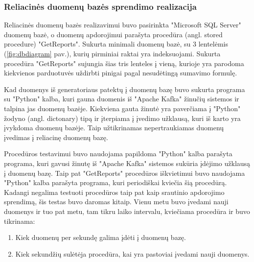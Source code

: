 \documentclass{VUMIFPSkursinis}
\begin{document}
 \subsubsection{Reliacinės duomenų bazės sprendimo realizacija}

Reliacinės duomenų bazės realizavimui buvo pasirinkta "Microsoft SQL Server" duomenų bazė, o duomenų apdorojimui parašyta procedūra (angl. stored procedure) "GetReports".
Sukurta minimali duomenų bazė, su 3 lentelėmis (\ref{fig:dbdiagram} pav.), kurių pirminiai raktai yra indeksuojami. Sukurta procedūra "GetReports" sujungia šias tris lenteles į vieną, kurioje yra parodoma kiekvienos 
parduotuvės uždirbti pinigai pagal nesudėtingą sumavimo formulę.\par
Kad duomenys iš generatoriaus patektų į duomenų bazę buvo sukurta programa su "Python" kalba, kuri gauna duomenis iš "Apache Kafka" žinučių sistemos ir talpina jas
duomenų bazėje. Kiekviena gauta žinutė yra paverčiama į "Python" žodyno (angl. dictonary) tipą ir įterpiama į įvedimo užklausą, kuri iš karto yra 
įvykdoma duomenų bazėje. Taip užtikrinamas nepertraukiamas duomenų įvedimas į reliacinę duomenų bazę.\par
Procedūros testavimui buvo naudojama papildoma "Python" kalba parašyta programa, kuri gavusi žinutę iš "Apache Kafka" sistemos sukūria įdėjimo užklausą į duomenų bazę.
Taip pat "GetReports" procedūros iškvietimui buvo naudojama "Python" kalba parašyta programa, kuri periodiškai kviečia šią procedūrą. 
Kadangi negalima testuoti procedūros taip pat kaip srautinio apdorojimo sprendimą, šis testas buvo daromas kitaip.
Vienu metu buvo įvedami nauji duomenys ir tuo pat metu, tam tikru laiko intervalu, kviečiama procedūra ir buvo tikrinama:
    \begin{enumerate}
        \item Kiek duomenų per sekundę galima įdėti į duomenų bazę.
        \item Kiek sekundžių sulėtėja procedūra, kai yra pastoviai įvedami nauji duomenys.
    \end{enumerate}
\end{document}
